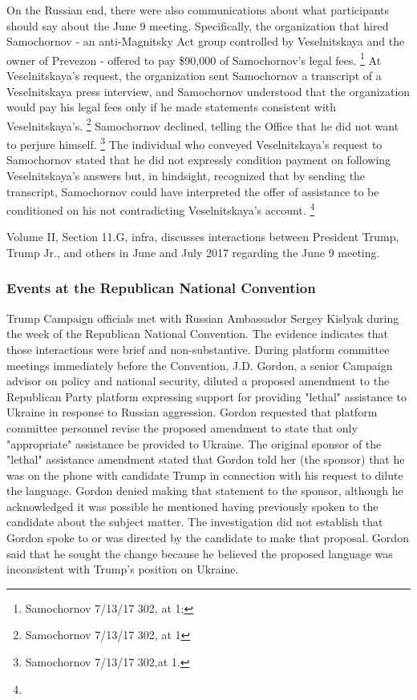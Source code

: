 On the Russian end, there were also communications about what participants should say about the June 9 meeting.
Specifically, the organization that hired Samochornov - an anti-Magnitsky Act group controlled by Veselnitskaya and the owner of Prevezon - offered to pay \$90,000 of Samochornov's legal fees.%
\footnote{Samochornov 7/13/17 302, at 1; }
At Veselnitskaya's request, the organization sent Samochornov a transcript of a Veselnitskaya press interview, and Samochornov understood that the organization would pay his legal fees only if he made statements consistent with Veselnitskaya's.%
\footnote{ Samochornov 7/13/17 302, at 1}
Samochornov declined, telling the Office that he did not want to perjure himself.%
\footnote{Samochornov 7/13/17 302,at 1.}
The individual who conveyed Veselnitskaya's request to Samochornov stated that he did not expressly condition payment on following Veselnitskaya's answers but, in hindsight, recognized that by sending the transcript, Samochornov could have interpreted the offer of assistance to be conditioned on his not contradicting Veselnitskaya's account.%
\footnote{}

Volume II, Section 11.G, infra, discusses interactions between President Trump, Trump Jr., and others in June and July 2017 regarding the June 9 meeting.

\subsubsection{Events at the Republican National Convention}

Trump Campaign officials met with Russian Ambassador Sergey Kislyak during the week of the Republican National Convention.
The evidence indicates that those interactions were brief and non-substantive.
During platform committee meetings immediately before the Convention, J.D. Gordon, a senior Campaign advisor on policy and national security, diluted a proposed amendment to the Republican Party platform expressing support for providing "lethal" assistance to Ukraine in response to Russian aggression.
Gordon requested that platform committee personnel revise the proposed amendment to state that only "appropriate" assistance be provided to Ukraine.
The original sponsor of the "lethal" assistance amendment stated that Gordon told her (the sponsor) that he was on the phone with candidate Trump in connection with his request to dilute the language.
Gordon denied making that statement to the sponsor, although he acknowledged it was possible he mentioned having previously spoken to the candidate about the subject matter.
The investigation did not establish that Gordon spoke to or was directed by the candidate to make that proposal.
Gordon said that he sought the change because he believed the proposed language was inconsistent with Trump's position on Ukraine.

